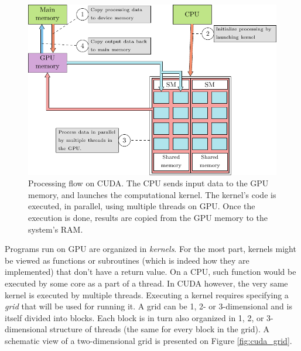 \begin{figure}[ht]
    \centering
    \includegraphics[width=\textwidth]{figures/cuda_workflow}
    \caption{Processing flow on CUDA. The CPU sends input data to the GPU memory, and launches the computational kernel. The kernel's code is executed, in parallel, using multiple threads on GPU. Once the execution is done, results are copied from the GPU memory to the system's RAM.}
    \label{fig:cuda_flow}
\end{figure}

Programs run on GPU are organized in \emph{kernels}. For the most part, kernels might be viewed as functions or subroutines (which is indeed how they are implemented) that don't have a return value. On a CPU, such function would be executed by some core as a part of a thread. In CUDA however, the very same kernel is executed by multiple threads. Executing a kernel requires specifying a \emph{grid} that will be used for running it. A grid can be 1, 2- or 3-dimensional and is itself divided into blocks. Each block is in turn also organized in 1, 2, or 3-dimensional structure of threads (the same for every block in the grid). A schematic view of a two-dimensional grid is presented on Figure \ref{fig:cuda_grid}.

